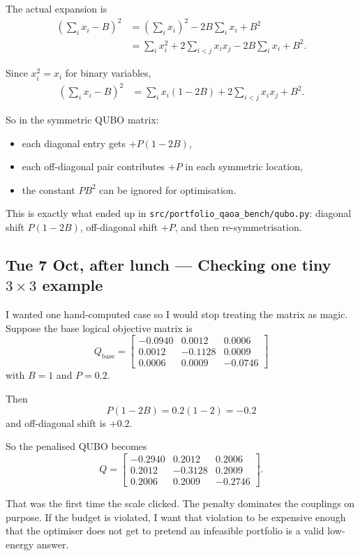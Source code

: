 \documentclass[11pt]{article}
\newcommand{\entry}[2]{\subsection*{#1 --- #2}}
\newcommand{\repo}[1]{\texttt{#1}}
\begin{document}
The actual expansion is
\begin{align*}
\left(\sum_i x_i - B\right)^2
&=
\left(\sum_i x_i\right)^2 - 2B \sum_i x_i + B^2 \\
&=
\sum_i x_i^2 + 2\sum_{i<j} x_i x_j - 2B\sum_i x_i + B^2.
\end{align*}

Since \(x_i^2 = x_i\) for binary variables,
\begin{align*}
\left(\sum_i x_i - B\right)^2
&=
\sum_i x_i (1 - 2B) + 2\sum_{i<j} x_i x_j + B^2.
\end{align*}

So in the symmetric QUBO matrix:
\begin{itemize}[leftmargin=1.4em]
\item each diagonal entry gets \(+P(1-2B)\),
\item each off-diagonal pair contributes \(+P\) in each symmetric location,
\item the constant \(PB^2\) can be ignored for optimisation.
\end{itemize}

This is exactly what ended up in \repo{src/portfolio\_qaoa\_bench/qubo.py}:
diagonal shift \(P(1-2B)\), off-diagonal shift \(+P\), and then re-symmetrisation.

\entry{Tue 7 Oct, after lunch}{Checking one tiny \(3\times 3\) example}

I wanted one hand-computed case so I would stop treating the matrix as magic.
Suppose the base logical objective matrix is
\[
Q_{\text{base}} =
\begin{bmatrix}
-0.0940 & 0.0012 & 0.0006 \\
0.0012 & -0.1128 & 0.0009 \\
0.0006 & 0.0009 & -0.0746
\end{bmatrix}
\]
with \(B=1\) and \(P=0.2\).

Then
\[
P(1-2B) = 0.2(1-2) = -0.2
\]
and off-diagonal shift is \(+0.2\).

So the penalised QUBO becomes
\[
Q =
\begin{bmatrix}
-0.2940 & 0.2012 & 0.2006 \\
0.2012 & -0.3128 & 0.2009 \\
0.2006 & 0.2009 & -0.2746
\end{bmatrix}.
\]

That was the first time the scale clicked. The penalty dominates the couplings on purpose.
If the budget is violated, I want that violation to be expensive enough that the optimiser does
not get to pretend an infeasible portfolio is a valid low-energy answer.
\end{document}
